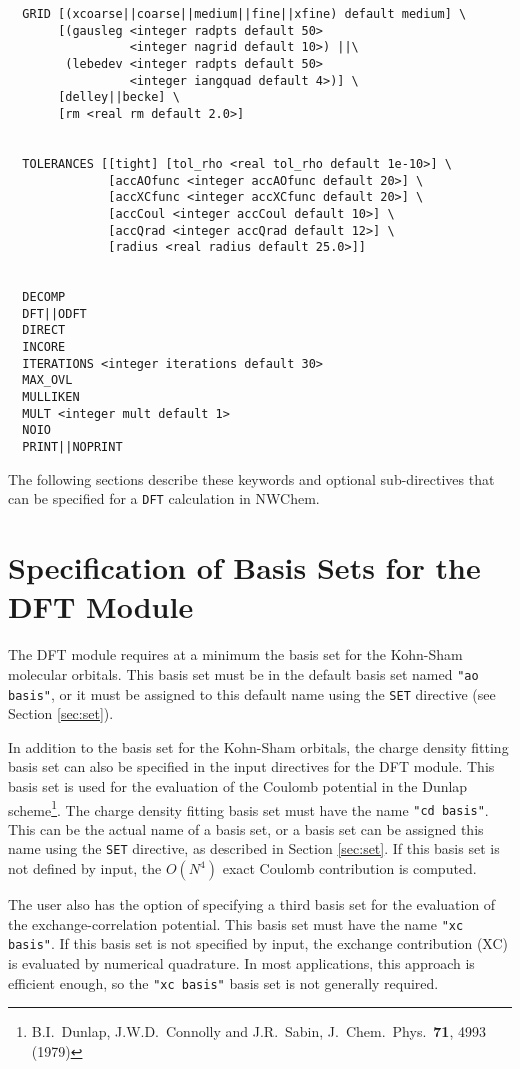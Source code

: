\begin{verbatim}
  GRID [(xcoarse||coarse||medium||fine||xfine) default medium] \
       [(gausleg <integer radpts default 50> 
                 <integer nagrid default 10>) ||\ 
        (lebedev <integer radpts default 50> 
                 <integer iangquad default 4>)] \ 
       [delley||becke] \
       [rm <real rm default 2.0>]
        

  TOLERANCES [[tight] [tol_rho <real tol_rho default 1e-10>] \
              [accAOfunc <integer accAOfunc default 20>] \
              [accXCfunc <integer accXCfunc default 20>] \
              [accCoul <integer accCoul default 10>] \
              [accQrad <integer accQrad default 12>] \
              [radius <real radius default 25.0>]]


  DECOMP
  DFT||ODFT
  DIRECT
  INCORE
  ITERATIONS <integer iterations default 30>
  MAX_OVL
  MULLIKEN
  MULT <integer mult default 1>
  NOIO
  PRINT||NOPRINT
\end{verbatim}

The following 
sections describe these keywords and
optional sub-directives that can be specified for a \verb+DFT+ calculation
in NWChem.

\section{Specification of Basis Sets for the DFT Module}

The DFT module requires at a minimum the basis set for the Kohn-Sham 
molecular orbitals.  This basis set must be in the default basis set named
{\tt "ao basis"}, or it must be assigned to this default name using the
\verb+SET+ directive (see Section \ref{sec:set}).

In addition to the basis set for the Kohn-Sham orbitals, 
the charge density fitting basis set can also be specified in the 
input directives for the DFT module.  This basis set is used for the 
evaluation of the Coulomb potential in the Dunlap scheme\footnote{B.I.~Dunlap, 
J.W.D.~Connolly and J.R.~Sabin, J.~Chem.~Phys.~{\bf 71},  4993 (1979)}.
The charge density fitting basis set must have the name {\tt "cd basis"}.
This can be the actual name of a basis set, or a basis set can be 
assigned this name using the \verb+SET+ directive, as described in
Section \ref{sec:set}.  If this basis set is not defined by input,
the $O(N^4)$ exact Coulomb contribution is computed.

The user also has the option of specifying a third basis set for the 
evaluation of the exchange-correlation potential.  This basis set must
have the name {\tt "xc basis"}.  If this basis set is not specified
by input, the exchange contribution (XC) is evaluated by numerical
quadrature.  In most applications, this approach is efficient enough,
so the {\tt "xc basis"} basis set is not generally required.

